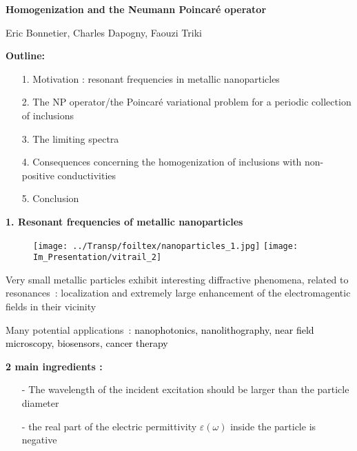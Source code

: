 \documentclass[mathserif,9pt]{beamer}
\begin{document}
\usebackgroundtemplate{}

\begin{frame}

\textcolor{b_bruz}{\bf{\Large{Homogenization and the Neumann Poincar\'e operator}}}
\vspace*{1cm}

\small{
Eric Bonnetier, Charles Dapogny, Faouzi Triki
\vspace*{10mm}

\textcolor{blue_bruz}{\bf Outline:}
\medskip

\begin{itemize}
\item[1.] Motivation : resonant frequencies in metallic
nanoparticles 

\item[2.]
The NP operator/the Poincar\'e variational problem
for a periodic collection of inclusions

\item[3.]
The limiting spectra

\item[4.]
Consequences concerning the homogenization of 
inclusions with non-positive conductivities

\item[5.]
Conclusion
\end{itemize}

}
\end{frame}
\begin{frame}
\small{

\textcolor{b_bruz}{\Large{\bf 1. Resonant frequencies of metallic nanoparticles}}

\begin{figure}[hbt]
\texttt{[image: ../Transp/foiltex/nanoparticles\_1.jpg]}
\hspace*{4mm}
\texttt{[image: Im\_Presentation/vitrail\_2]}
\end{figure}
\bigskip

Very small metallic particles exhibit interesting diffractive phenomena,
related to resonances~: \textcolor{b_bruz}{localization and extremely large 
enhancement of the electromagentic fields in their vicinity}
\medskip

Many potential applications~: \textcolor{black}{nanophotonics, 
nanolithography, near field microscopy,  biosensors, cancer therapy}
\medskip

\textcolor{b_bruz}{\bf 2 main ingredients :}
\begin{itemize}
\item[-]
The wavelength of the incident excitation should be larger than
the particle diameter

\item[-]
the real part of the electric permittivity $\varepsilon(\omega)$ 
inside the particle is negative 
\end{itemize}


}
\end{frame}
\end{document}
